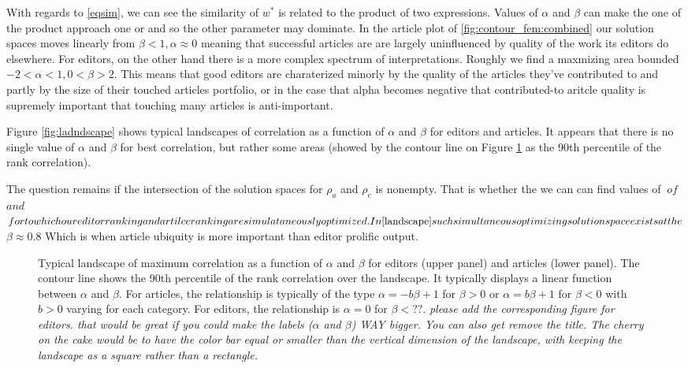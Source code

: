 With regards to \eqref{eqsim}, we can see the similarity of $w^*$ is related to the product of two expressions. Values of $\alpha$ and $\beta$ can make the one of the product approach one or and so the other parameter may dominate. In the article plot of \ref{fig:contour_fem:combined} our solution spaces moves linearly from $ \beta < 1 , \alpha \approx 0$ meaning that successful articles are are largely uninfluenced by quality of the work its editors do elsewhere. For editors, on the other hand there is a more complex spectrum of interpretations. Roughly we find a maxmizing area bounded $ -2  <\alpha < 1 , 0 < \beta > 2 $. This means that good editors are charaterized minorly by the quality of the articles they've contributed to and partly by the size of their touched articles portfolio, or in the case that alpha becomes negative that contributed-to aritcle quality is supremely important that touching many articles is anti-important.


Figure \ref{fig:ladndscape} shows typical landscapes of correlation as a function of $\alpha$ and $\beta$ for editors and articles. It appears that there is no single value of $\alpha$ and $\beta$ for best correlation, but rather some areas (showed by the contour line on Figure \ref{fig:landscape} as the 90th percentile of the rank correlation).

The question remains if the intersection of the solution spaces for $\rho_a$ and $\rho_e$ is nonempty. That is whether the we can can find values of $\ of $\alpha$ and $\beta$ for to which our editor ranking and artilce ranking are simulataneously optimized. In \ref{landscape} such simultaneous optimizing solution space exists at the $\alpha {}$ \beta \approx 0.8$ Which is when article ubiquity is more important than editor prolific output.

\begin{figure}[!t]
\centering
\caption{Typical landscape of maximum correlation as a function of $\alpha$ and $\beta$ for editors (upper panel) and articles (lower panel). The contour line shows the 90th percentile of the rank correlation over the landscape. It typically displays a linear function between $\alpha$ and $\beta$. For articles, the relationship is typically of the type $\alpha = - b \beta + 1$ for $\beta >0$ or $\alpha = b \beta + 1$ for $\beta < 0$ with $b>0$ varying for each category. For editors, the relationship is $\alpha = 0$ for $\beta < ??$. {\it please add the corresponding figure for editors.  that would be great if you could make the labels ($\alpha$ and $\beta$) WAY bigger. You can also get remove the title. The cherry on the cake would be to have the color bar equal or smaller than the vertical dimension of the landscape, with keeping the landscape as a square rather than a rectangle.}}
\label{fig:landscape}
\end{figure}

